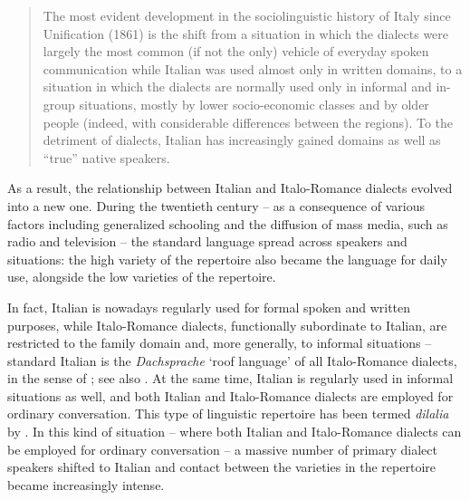 \begin{quote}
The most evident development in the sociolinguistic history of Italy since Unification (1861) is the shift from a situation in which the dialects were largely the most common (if not the only) vehicle of everyday spoken communication while Italian was used almost only in written domains, to a situation in which the dialects are normally used only in informal and in-group situations, mostly by lower socio-economic classes and by older people (indeed, with considerable differences between the regions). To the detriment of dialects, Italian has increasingly gained domains as well as “true” native speakers. \citep[498]{Berruto2018}
\end{quote}

\hspace*{-1.6pt}As a result, the relationship between Italian and Italo-Romance dialects evolved into a new one. During the twentieth century – as a consequence of various factors including generalized schooling and the diffusion of mass media, such as radio and television – the standard language spread across speakers and situations: the high variety of the repertoire also became the language for daily use, alongside the low varieties of the repertoire.

In fact, Italian is nowadays regularly used for formal spoken and written purposes, while Italo-Romance dialects, functionally subordinate to Italian, are restricted to the family domain and, more generally, to informal situations – standard Italian is the \textit{Dachsprache} ‘roof language’ of all Italo-Romance dialects, in the sense of \citet{Kloss1978}; see also \citet{Ammon1989}. At the same time, Italian is regularly used in informal situations as well, and both Italian and Italo-Romance dialects are employed for ordinary conversation. This type of linguistic repertoire has been termed \textit{dilalia} by \citet{Berruto1989}. In this kind of situation – where both Italian and Italo-Romance dialects can be employed for ordinary conversation – a massive number of primary dialect speakers shifted to Italian and contact between the varieties in the repertoire became increasingly intense.

